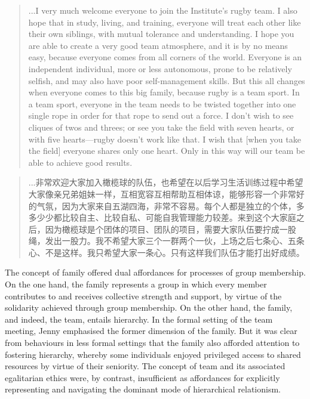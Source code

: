 \begin{CJK}{UTF8}{gbsn}
    \begin{quotation}
      ...I very much welcome everyone to join the Institute's rugby team. I also hope that in study, living, and training, everyone will treat each other like their own siblings, with mutual tolerance and understanding.  I hope you are able to create a very good team atmosphere, and it is by no means easy, because everyone comes from all corners of the world. Everyone is an independent individual, more or less autonomous, prone to be relatively selfish, and may also have poor self-management skills.  But this all changes when everyone comes to this big family, because rugby is a team sport. In a team sport, everyone in the team needs to be twisted together into one single rope in order for that rope to send out a force. I don't wish to see cliques of twos and threes; or see you take the field with seven hearts, or with five hearts---rugby doesn't work like that. I wish that [when you take the field] everyone shares only one heart. Only in this way will our team be able to achieve good results.
    \end{quotation}

    \begin{quotation}
      ...非常欢迎大家加入橄榄球的队伍，也希望在以后学习生活训练过程中希望大家像亲兄弟姐妹一样，互相宽容互相帮助互相体谅，能够形容一个非常好的气氛，因为大家来自五湖四海，非常不容易。每个人都是独立的个体，多多少少都比较自主、比较自私、可能自我管理能力较差。来到这个大家庭之后，因为橄榄球是个团体的项目、团队的项目，需要大家队伍要拧成一股绳，发出一股力。我不希望大家三个一群两个一伙，上场之后七条心、五条心、不是这样。我只希望大家一条心。只有这样我们队伍才能打出好成绩。
    \end{quotation}

The concept of family offered dual affordances for processes of group membership.  On the one hand, the family represents a group in which every member contributes to and receives collective strength and support, by virtue of the solidarity achieved through group membership.  On the other hand, the family, and indeed, the team,  entails hierarchy.  In the formal setting of the team meeting, Jenny emphasised the former dimension of the family.  But it was clear from behaviours in less formal settings that the family also afforded attention to fostering hierarchy, whereby some individuals enjoyed privileged access to shared resources by virtue of their seniority.  The concept of team and its associated egalitarian ethics were, by contrast, insufficient as affordances for explicitly representing and navigating the dominant mode of hierarchical relationism.


\end{CJK}
